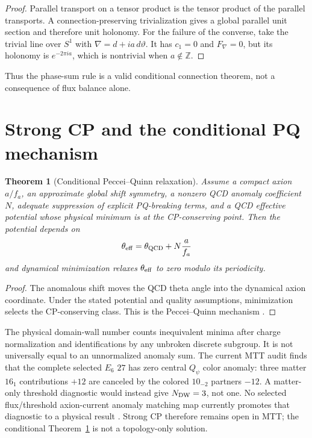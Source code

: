 \documentclass[11pt]{article}
\theoremstyle{plain}
\newtheorem{theorem}{Theorem}[section]
\theoremstyle{definition}
\theoremstyle{remark}
\newcommand{\Z}{\mathbb{Z}}
\begin{document}
\begin{proof}
Parallel transport on a tensor product is the tensor product of the parallel
transports. A connection-preserving trivialization gives a global parallel
unit section and therefore unit holonomy. For the failure of the converse,
take the trivial line over $S^1$ with
$\nabla=d+i a\,d\vartheta$. It has $c_1=0$ and $F_\nabla=0$, but its holonomy is
$e^{-2\pi i a}$, which is nontrivial when $a\notin\Z$.
\end{proof}

Thus the phase-sum rule is a valid conditional connection theorem, not a
consequence of flux balance alone.

\section{Strong CP and the conditional PQ mechanism}

\begin{theorem}[Conditional Peccei--Quinn relaxation]
\label{thm:pq}
Assume a compact axion $a/f_a$, an approximate global shift symmetry, a
nonzero QCD anomaly coefficient $N$, adequate suppression of explicit
PQ-breaking terms, and a QCD effective potential whose physical minimum is at
the CP-conserving point. Then the potential depends on
\[
 \theta_{\rm eff}=\theta_{\rm QCD}+N\frac{a}{f_a}
\]
and dynamical minimization relaxes $\theta_{\rm eff}$ to zero modulo its
periodicity.
\end{theorem}

\begin{proof}
The anomalous shift moves the QCD theta angle into the dynamical axion
coordinate. Under the stated potential and quality assumptions, minimization
selects the CP-conserving class. This is the Peccei--Quinn mechanism
\cite{PecceiQuinn1977}.
\end{proof}

The physical domain-wall number counts inequivalent minima after charge
normalization and identifications by any unbroken discrete subgroup. It is not
universally equal to an unnormalized anomaly sum. The current MTT audit finds
that the complete selected $E_6$ $27$ has zero central $Q_\psi$ color anomaly:
three matter $16_1$ contributions $+12$ are canceled by the colored
$10_{-2}$ partners $-12$. A matter-only threshold diagnostic would instead
give $N_{\rm DW}=3$, not one. No selected flux/threshold axion-current anomaly
matching map currently promotes that diagnostic to a physical result
\cite{MTTStrongCP}. Strong CP therefore remains open in MTT; the conditional
Theorem~\ref{thm:pq} is not a topology-only solution.
\end{document}
